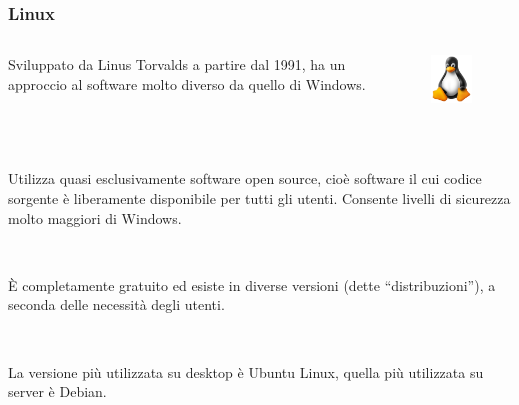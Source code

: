 \documentclass[handout]{beamer}
\begin{document}
\begin{frame}
\frametitle{Linux}
\begin{columns}
\begin{column}{.75\textwidth}
  Sviluppato da Linus Torvalds a partire dal 1991, ha un approccio al software molto diverso da quello di Windows.
\end{column}
\begin{column}{.15\textwidth}
  \begin{figure}
    \includegraphics[width=\columnwidth]{img/tux.png}
  \end{figure}\pause
\end{column}
\end{columns}

~

Utilizza quasi esclusivamente software \alert<2>{open source}, cioè software il cui codice sorgente è liberamente disponibile per tutti gli utenti. Consente livelli di sicurezza molto maggiori di Windows.\pause

~

È completamente gratuito ed esiste in diverse versioni (dette ``distribuzioni''), a seconda delle necessità degli utenti.\pause

~

La versione più utilizzata su desktop è \alert<4>{Ubuntu Linux}, quella più utilizzata su server è \alert<4>{Debian}.
\end{frame}
\end{document}
